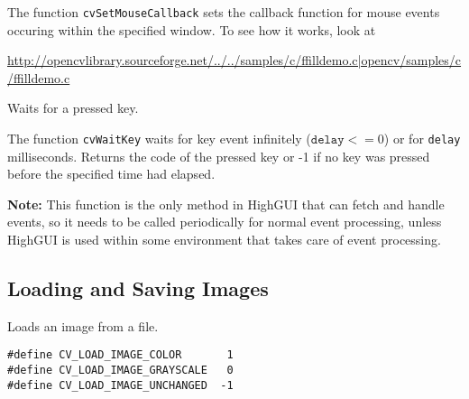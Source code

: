 The function \texttt{cvSetMouseCallback} sets the callback function for mouse events occuring within the specified window. To see how it works, look at 

\url{http://opencvlibrary.sourceforge.net/../../samples/c/ffilldemo.c|opencv/samples/c/ffilldemo.c} 


Waits for a pressed key.


\begin{description}
\end{description}

The function \texttt{cvWaitKey} waits for key event infinitely ($ \texttt{delay} <= 0$) or for \texttt{delay} milliseconds. Returns the code of the pressed key or -1 if no key was pressed before the specified time had elapsed.

\textbf{Note:} This function is the only method in HighGUI that can fetch and handle events, so it needs to be called periodically for normal event processing, unless HighGUI is used within some environment that takes care of event processing.

\subsection{Loading and Saving Images}


Loads an image from a file.


\begin{lstlisting}
#define CV_LOAD_IMAGE_COLOR       1
#define CV_LOAD_IMAGE_GRAYSCALE   0
#define CV_LOAD_IMAGE_UNCHANGED  -1
\end{lstlisting}

\begin{description}
\end{description}

